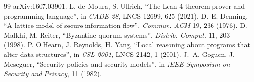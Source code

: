 \documentclass[11pt,a4paper]{article}
\theoremstyle{definition}
\theoremstyle{remark}
\begin{document}
\begin{thebibliography}{99}
arXiv:1607.03901.
 L. de~Moura, S. Ullrich, ``The Lean 4 theorem prover and programming language'', in \emph{CADE 28}, LNCS 12699, 625
(2021).
 D.~E. Denning, ``A lattice model of secure information flow'', \emph{Commun. ACM} 19, 236 (1976).
 D. Malkhi, M. Reiter, ``Byzantine quorum systems'', \emph{Distrib. Comput.} 11, 203 (1998).
 P. O'Hearn, J. Reynolds, H. Yang, ``Local reasoning about programs that alter data structures'', in \emph{CSL 2001},
LNCS 2142, 1 (2001).
 J.~A. Goguen, J. Meseguer, ``Security policies and security models'', in \emph{IEEE Symposium on Security and Privacy}, 11
(1982).
\end{thebibliography}
\end{document}
